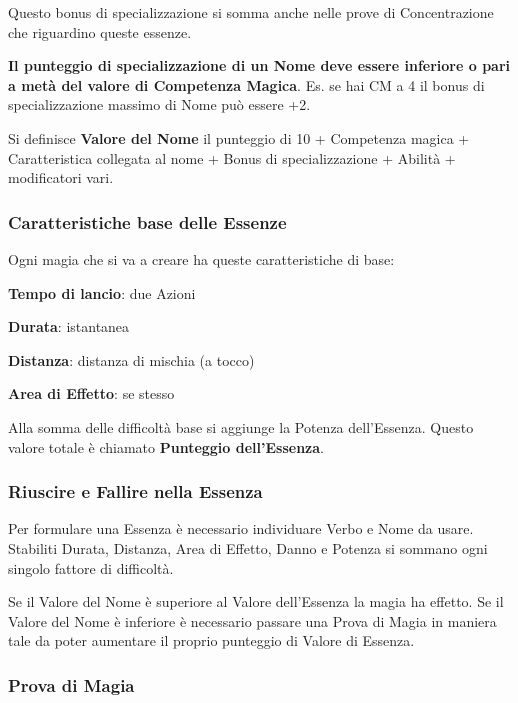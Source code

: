 \documentclass[a4paper,twoside,openany]{book}
\begin{document}
\begin{multicols}{2}
Questo bonus di specializzazione si somma anche nelle prove di Concentrazione che riguardino queste essenze.

\textbf{Il punteggio di specializzazione di un Nome deve essere inferiore o pari a metà del valore di Competenza Magica}. Es. se hai CM a 4 il bonus di specializzazione massimo di Nome può essere +2.

Si definisce \textbf{Valore del Nome} il punteggio di 10 + Competenza magica + Caratteristica collegata al nome + Bonus di specializzazione + Abilità + modificatori vari.

\subsubsection{Caratteristiche base delle Essenze}

\label{caratteristiche-base-delle-essenze}

Ogni magia che si va a creare ha queste caratteristiche di base:

\smallskip

\textbf{Tempo di lancio}: due Azioni

\textbf{Durata}: istantanea

\textbf{Distanza}: distanza di mischia (a tocco)

\textbf{Area di Effetto}: se stesso

Alla somma delle difficoltà base si aggiunge la Potenza dell'Essenza. Questo valore totale è chiamato \textbf{Punteggio dell'Essenza}.

\subsubsection{Riuscire e Fallire nella Essenza}

\label{riuscire-e-fallire-nella-prova-di-magia}

Per formulare una Essenza è necessario individuare Verbo e Nome da usare.
Stabiliti Durata, Distanza, Area di Effetto, Danno e Potenza si sommano ogni singolo fattore di difficoltà.

Se il Valore del Nome è superiore al Valore dell'Essenza la magia ha effetto. Se il Valore del Nome è inferiore è necessario passare una Prova di Magia in maniera tale da poter aumentare il proprio punteggio di Valore di Essenza.

\subsubsection{Prova di Magia}\label{magieprovadimagia}


\end{multicols}
\end{document}
